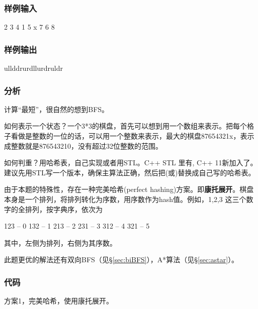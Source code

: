 \subsubsection{样例输入}
\begin{Code}
2  3  4  1  5  x  7  6  8
\end{Code}

\subsubsection{样例输出}
\begin{Code}
ullddrurdllurdruldr
\end{Code}

\subsubsection{分析}
计算“最短”，很自然的想到BFS。

如何表示一个状态？一个3*3的棋盘，首先可以想到用一个数组来表示。把每个格子看做是整数的一位的话，可以用一个整数来表示，最大的棋盘87654321x，表示成整数就是876543210，没有超过32位整数的范围。

如何判重？用哈希表，自己实现或者用STL。C++ STL 里有, C++ 11新加入了。建议先用STL写一个版本，确保主算法正确，然后把(或)替换成自己写的哈希表。

由于本题的特殊性，存在一种完美哈希(perfect hashing)方案。即\textbf{康托展开}。棋盘本身是一个排列，将排列转化为序数，用序数作为hash值。例如，1,2,3 这三个数字的全排列，按字典序，依次为
\begin{Code}
123 -- 0
132 -- 1
213 -- 2
231 -- 3
312 -- 4
321 -- 5
\end{Code}
其中，左侧为排列，右侧为其序数。

此题更优的解法还有双向BFS（见\S \ref{sec:biBFS}），A*算法（见\S \ref{sec:astar}）。

\subsubsection{代码}

方案1，完美哈希，使用康托展开。

